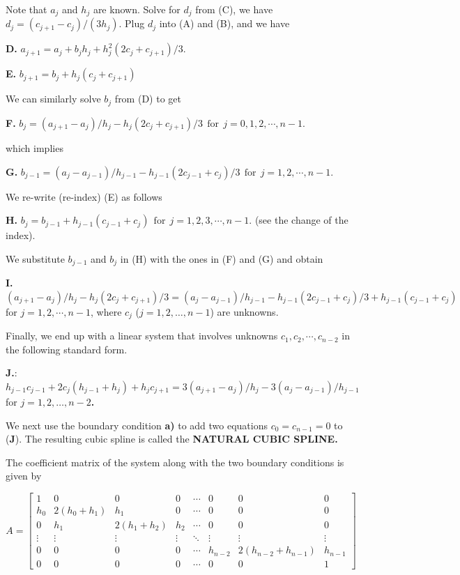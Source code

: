 \documentclass[
]{book}
\begin{document}
Note that \(a_j\) and \(h_j\) are known. Solve for \(d_j\) from (C), we have \(d_j = (c_{j+1} - c_j)/(3h_j)\). Plug \(d_j\) into (A) and (B), and we have

\textbf{D.} \(a_{j+1}= a_j + b_jh_j + h^2_j(2c_j + c_{j+1})/3\).

\textbf{E.} \(b_{j+1} = b_j + h_j (c_j + c_{j+1})\)

We can similarly solve \(b_j\) from (D) to get

\textbf{F.} \(b_j =(a_{j+1} - a_j )/h_j - h_j(2c_j + c_{j+1})/3 ~~ \text{for}~~ j = 0, 1, 2, \cdots, n-1\).

which implies

\textbf{G.} \(b_{j-1} =(a_j - a_{j-1} )/h_{j-1} - h_{j-1}(2c_{j-1} + c_j)/3 ~~\text{for}~~ j = 1, 2, \cdots, n-1\).

We re-write (re-index) (E) as follows

\textbf{H.} \(b_j = b_{j-1} + h_{j-1} (c_{j-1} + c_j) ~~\text{for}~~ j = 1 ,2 ,3 ,\cdots, n-1.\) (see the change of the index).

We substitute \(b_{j-1}\) and \(b_j\) in (H) with the ones in (F) and (G) and obtain

\textbf{I.} \((a_{j+1} - a_j )/h_j -h_j(2c_j + c_{j+1})/3 =(a_j - a_{j-1} )/h_{j-1} -h_{j-1}(2c_{j-1} + c_j)/3 + h_{j-1} (c_{j-1} + c_j)\) for \(j = 1, 2, \cdots, n-1\), where \(c_j\) (\(j=1,2,…,n-1\)) are unknowns.

Finally, we end up with a linear system that involves unknowns \(c_1, c_2, \cdots, c_{n-2}\) in the following standard form.

\textbf{J.}: \textbf{\color{red}\(h_{j-1}c_{j-1}+2c_j (h_{j-1}+h_j )+h_jc_{j+1} =3(a_{j+1}-a_j )/h_j-3(a_j -a_{j-1})/h_{j-1}\)} for \textbf{\color{blue}\(j = 1, 2, …, n-2\).}

We next use the boundary condition \textbf{a)} to add two equations \(c_0 = c_{n-1} = 0\) to (\textbf{J}). The resulting cubic spline is called the \textbf{\color{red} NATURAL CUBIC SPLINE.}

The coefficient matrix of the system along with the two boundary conditions is given by

\[
A = \left[
\begin{array}{ccccccccc}
 1 & 0 &  0 & 0 & \cdots & 0 & 0 & 0\\ 
 h_0 & 2(h_0+h_1) &  h_1 & 0 & \cdots & 0 & 0 & 0\\ 
 0 & h_1 & 2(h_1+h_2) &  h_2  & \cdots & 0 & 0 & 0\\ 
 \vdots & \vdots &  \vdots & \vdots & \ddots & \vdots & \vdots & \vdots\\ 
 0 & 0 & 0 &  0  & \cdots & h_{n-2}& 2(h_{n-2}+h_{n-1}) & h_{n-1}\\
 0 &  0 & 0 & 0 &  \cdots & 0 & 0 & 1
\end{array}
\right]
\]
\end{document}
